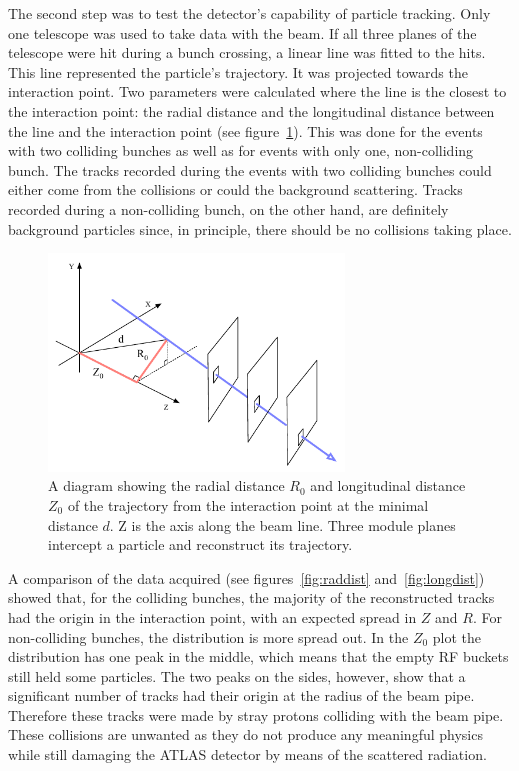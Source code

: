 \documentclass[twoside,12pt]{packages/mytustyle}  %
\begin{document}
The second step was to test the detector's capability of particle tracking. Only one telescope was used to take data with the beam. If all three planes of the telescope were hit during a bunch crossing, a linear line was fitted to the hits. This line represented the particle's trajectory. It was projected towards the interaction point. Two parameters were calculated where the line is the closest to the interaction point: the radial distance and the longitudinal distance between the line and the interaction point (see figure~\ref{fig:z-r-distance}). This was done for the events with two colliding bunches as well as for events with only one, non-colliding bunch. The tracks recorded during the events with two colliding bunches could either come from the collisions or could the background scattering. Tracks recorded during a non-colliding bunch, on the other hand, are definitely background particles since, in principle, there should be no collisions taking place. 
\begin{figure}[!t]
\centering
\includegraphics[width=0.7\textwidth]{../../scripts/04_charge_monitoring/plots/z-r-distance}
\caption{A diagram showing the radial distance $R_\mathrm{0}$ and longitudinal distance $Z_\mathrm{0}$ of the trajectory from the interaction point at the minimal distance $d$. Z is the axis along the beam line. Three module planes intercept a particle and reconstruct its trajectory.}
\label{fig:z-r-distance}
\end{figure}

A comparison of the data acquired (see figures~\ref{fig:raddist} and~\ref{fig:longdist}) showed that, for the colliding bunches, the majority of the reconstructed tracks had the origin in the interaction point, with an expected spread in $Z$ and $R$. For non-colliding bunches, the distribution is more spread out. In the $Z_\mathrm{0}$ plot the distribution has one peak in the middle, which means that the empty RF buckets still held some particles. The two peaks on the sides, however, show that a significant number of tracks had their origin at the radius of the beam pipe. Therefore these tracks were made by stray protons colliding with the beam pipe. These collisions are unwanted as they do not produce any meaningful physics while still damaging the ATLAS detector by means of the scattered radiation.
\end{document}
